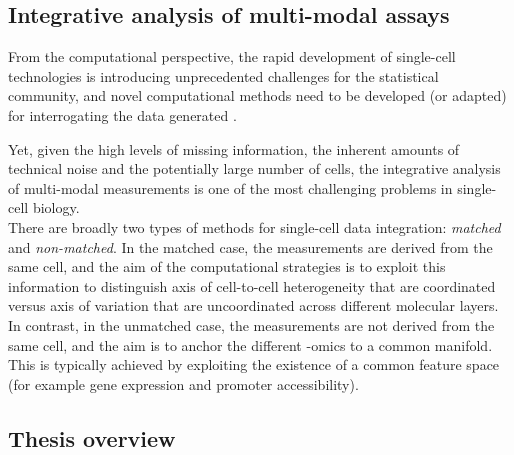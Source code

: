 

\subsection{Integrative analysis of multi-modal assays}

From the computational perspective, the rapid development of single-cell technologies is introducing unprecedented challenges for the statistical community, and novel computational methods need to be developed (or adapted) for interrogating the data generated \cite{Stegle2015}. 


Yet, given the high levels of missing information, the inherent amounts of technical noise and the potentially large number of cells, the integrative analysis of multi-modal measurements is one of the most challenging problems in single-cell biology. \\



% 

There are broadly two types of methods for single-cell data integration: \textit{matched} and \textit{non-matched}. In the matched case, the measurements are derived from the same cell, and the aim of the computational strategies is to exploit this information to distinguish axis of cell-to-cell heterogeneity that are coordinated versus axis of variation that are uncoordinated across different molecular layers.\\
In contrast, in the unmatched case, the measurements are not derived from the same cell, and the aim is to anchor the different -omics to a common manifold. This is typically achieved by  exploiting the existence of a common feature space (for example gene expression and promoter accessibility).




\subsection{Thesis overview}

